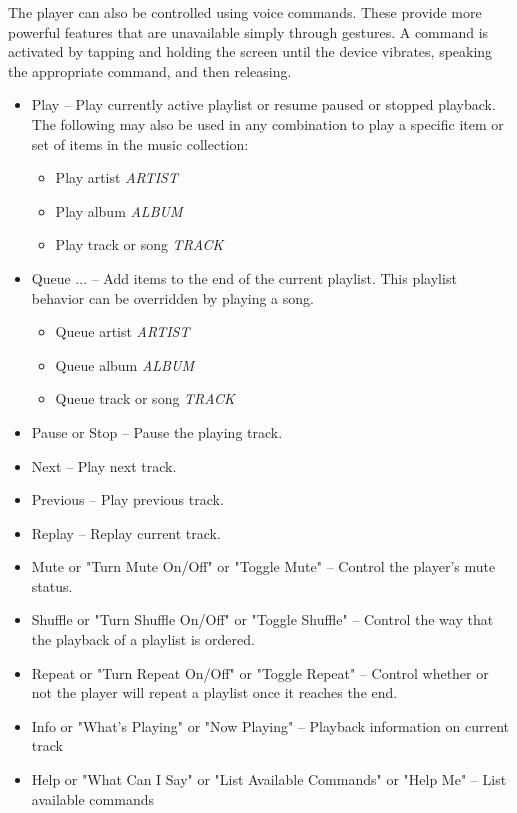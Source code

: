 \documentclass[12pt,letterpaper]{article}
\begin{document}
The player can also be controlled using voice commands. These provide more powerful features that are unavailable simply through gestures. A command is activated by tapping and holding the screen until the device vibrates, speaking the appropriate command, and then releasing.

\begin{itemize}
\item Play -- Play currently active playlist or resume paused or stopped playback. \\ The following may also be used in any combination to play a specific item or set of items in the music collection:
	\begin{itemize}
	\item Play artist \textit{ARTIST}
	\item Play album \textit{ALBUM}
	\item Play track or song \textit{TRACK}
	\end{itemize}
\item Queue ... -- Add items to the end of the current playlist. This playlist behavior can be overridden by playing a song.
	\begin{itemize}
	\item Queue artist \textit{ARTIST}
	\item Queue album \textit{ALBUM}
	\item Queue track or song \textit{TRACK}
	\end{itemize}
\item Pause or Stop -- Pause the playing track.
\item Next -- Play next track.
\item Previous -- Play previous track.
\item Replay -- Replay current track.
\item Mute or "Turn Mute On/Off" or "Toggle Mute" -- Control the player's mute status.
\item Shuffle or "Turn Shuffle On/Off" or "Toggle Shuffle" -- Control the way that the playback of a playlist is ordered.
\item Repeat or "Turn Repeat On/Off" or "Toggle Repeat" -- Control whether or not the player will repeat a playlist once it reaches the end.
\item Info or "What's Playing" or "Now Playing" -- Playback information on current track
\item Help or "What Can I Say" or "List Available Commands" or "Help Me" -- List available commands

\end{itemize}
\end{document}
